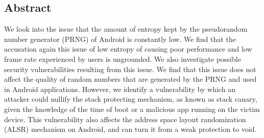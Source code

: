 \subsection*{Abstract}
We look into the issue that the amount of entropy kept by the pseudorandom number generator (PRNG) of Android is constantly low. We find that the accusation again this issue of low entropy of causing poor performance and low frame rate experienced by users is ungrounded. We also investigate possible security vulnerabilities resulting from this issue. We find that this issue does not affect the quality of random numbers that are generated by the PRNG and used in Android applications. However, we identify a vulnerability by which an attacker could nullify the stack protecting mechanism, as known as stack canary, given the knowledge of the time of boot or a malicious app running on the victim device. This vulnerability also affects the address space layout randomization (ALSR) mechanism on Android, and can turn it from a weak protection to void.


